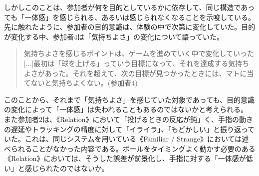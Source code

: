 しかしこのことは、参加者が何を目的としているかに依存して、同じ構造であっても「一体感」を感じられる、あるいは感じられなくなることを示唆している。
先に触れたように、参加者の目的意識は、体験の中で次第に変化していた。目的が変化する中、参加者4は「気持ちよさ」の変化について語っていた。
\begin{quote}
  気持ちよさを感じるポイントは、ゲームを進めていく中で変化していった[...]最初は「球を上げる」っていう目標になって、それを達成する気持ちよさがあった。それを超えて、次の目標が見つかったときには、マトに当てないと気持ちよくない。(参加者4)
\end{quote}
このことから、それまで「気持ちよさ」を感じていた対象であっても、目的意識の変化によって「一体感」は失われることもあるのではないかと考えられる。
また参加者2は、《Relation》において「投げるときの反応が鈍」く、手指の動きの遅延やトラッキングの精度に対して「イライラ」、「もどかしい」と振り返っていた。これは、同じシステムを用いている《Familiar / Strange》においては述べられることがなかった内容である。ボールをタイミングよく動かす必要のある《Relation》においては、そうした誤差が前景化し、手指に対する「一体感が低い」と感じられたのではないか。




